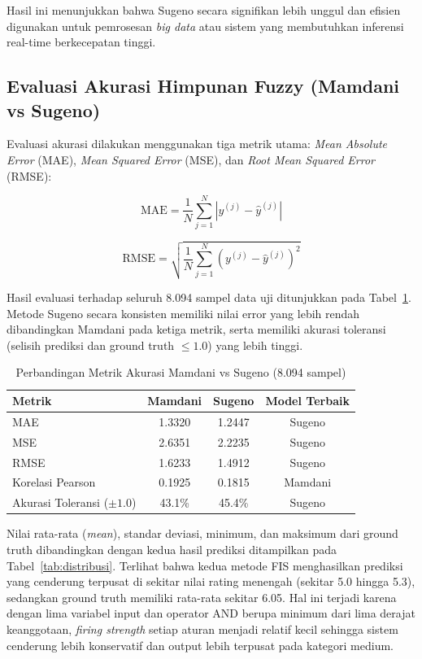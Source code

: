 \documentclass[11pt,a4paper]{article}
\begin{document}
Hasil ini menunjukkan bahwa Sugeno secara signifikan lebih unggul dan efisien digunakan untuk pemrosesan \textit{big data} atau sistem yang membutuhkan inferensi real-time berkecepatan tinggi.

\subsection{Evaluasi Akurasi Himpunan Fuzzy (Mamdani vs Sugeno)}
Evaluasi akurasi dilakukan menggunakan tiga metrik utama: \textit{Mean Absolute Error} (MAE), \textit{Mean Squared Error} (MSE), dan \textit{Root Mean Squared Error} (RMSE):

\begin{equation}
\text{MAE} = \frac{1}{N} \sum_{j=1}^{N} |y^{(j)} - \hat{y}^{(j)}|
\end{equation}

\begin{equation}
\text{RMSE} = \sqrt{\frac{1}{N} \sum_{j=1}^{N} (y^{(j)} - \hat{y}^{(j)})^2}
\end{equation}

Hasil evaluasi terhadap seluruh 8.094 sampel data uji ditunjukkan pada Tabel~\ref{tab:eval_fuzzy}. Metode Sugeno secara konsisten memiliki nilai error yang lebih rendah dibandingkan Mamdani pada ketiga metrik, serta memiliki akurasi toleransi (selisih prediksi dan ground truth $\le 1.0$) yang lebih tinggi.

\begin{table}[H]
\centering
\caption{Perbandingan Metrik Akurasi Mamdani vs Sugeno (8.094 sampel)}
\label{tab:eval_fuzzy}
\begin{tabular}{lccc}
\toprule
\textbf{Metrik} & \textbf{Mamdani} & \textbf{Sugeno} & \textbf{Model Terbaik} \\
\midrule
MAE & 1.3320 & 1.2447 & Sugeno \\
MSE & 2.6351 & 2.2235 & Sugeno \\
RMSE & 1.6233 & 1.4912 & Sugeno \\
Korelasi Pearson & 0.1925 & 0.1815 & Mamdani \\
Akurasi Toleransi ($\pm 1.0$) & 43.1\% & 45.4\% & Sugeno \\
\bottomrule
\end{tabular}
\end{table}

Nilai rata-rata (\textit{mean}), standar deviasi, minimum, dan maksimum dari ground truth dibandingkan dengan kedua hasil prediksi ditampilkan pada Tabel~\ref{tab:distribusi}. Terlihat bahwa kedua metode FIS menghasilkan prediksi yang cenderung terpusat di sekitar nilai rating menengah (sekitar 5.0 hingga 5.3), sedangkan ground truth memiliki rata-rata sekitar 6.05. Hal ini terjadi karena dengan lima variabel input dan operator AND berupa minimum dari lima derajat keanggotaan, \textit{firing strength} setiap aturan menjadi relatif kecil sehingga sistem cenderung lebih konservatif dan output lebih terpusat pada kategori medium.
\end{document}
